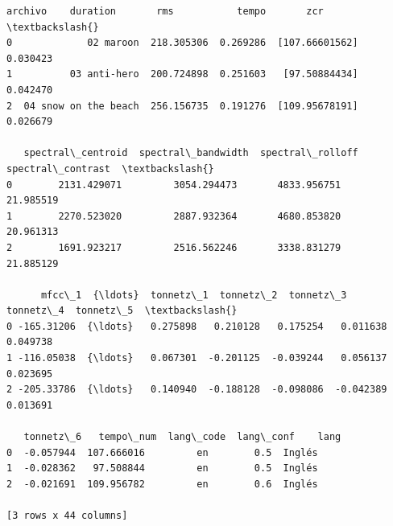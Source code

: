 \documentclass[11pt]{article}
\makeatletter
\newcommand{\boxspacing}{\kern\kvtcb@left@rule\kern\kvtcb@boxsep}
\newcommand{\prompt}[4]{
        {\ttfamily\llap{{\color{#2}[#3]:\hspace{3pt}#4}}\vspace{-\baselineskip}}
    }
\makeatother
\begin{document}
            \begin{tcolorbox}[breakable, size=fbox, boxrule=.5pt, pad at break*=1mm, opacityfill=0]
\prompt{Out}{outcolor}{19}{\boxspacing}
\begin{Verbatim}[commandchars=\\\{\}]
                archivo    duration       rms           tempo       zcr  \textbackslash{}
0             02 maroon  218.305306  0.269286  [107.66601562]  0.030423
1          03 anti-hero  200.724898  0.251603   [97.50884434]  0.042470
2  04 snow on the beach  256.156735  0.191276  [109.95678191]  0.026679

   spectral\_centroid  spectral\_bandwidth  spectral\_rolloff  spectral\_contrast  \textbackslash{}
0        2131.429071         3054.294473       4833.956751          21.985519
1        2270.523020         2887.932364       4680.853820          20.961313
2        1691.923217         2516.562246       3338.831279          21.885129

      mfcc\_1  {\ldots}  tonnetz\_1  tonnetz\_2  tonnetz\_3  tonnetz\_4  tonnetz\_5  \textbackslash{}
0 -165.31206  {\ldots}   0.275898   0.210128   0.175254   0.011638   0.049738
1 -116.05038  {\ldots}   0.067301  -0.201125  -0.039244   0.056137   0.023695
2 -205.33786  {\ldots}   0.140940  -0.188128  -0.098086  -0.042389   0.013691

   tonnetz\_6   tempo\_num  lang\_code  lang\_conf    lang
0  -0.057944  107.666016         en        0.5  Inglés
1  -0.028362   97.508844         en        0.5  Inglés
2  -0.021691  109.956782         en        0.6  Inglés

[3 rows x 44 columns]
\end{Verbatim}
\end{tcolorbox}
        
\end{document}
